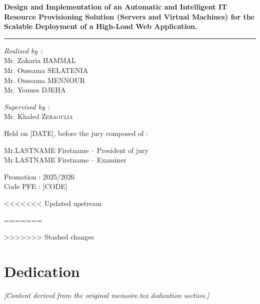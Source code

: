 \documentclass[12pt,a4paper]{report}
\begin{document}
\begin{titlepage}
{\Large \textbf{Design and Implementation of an Automatic and Intelligent IT Resource Provisioning Solution (Servers and Virtual Machines) for the Scalable Deployment of a High-Load Web Application.}}

\vspace{0.3cm}
\rule{\textwidth}{0.6pt}
\vspace{0.3cm}

\begin{minipage}{0.45\textwidth}
\normalsize \textit{Realized by :}\\
Mr. Zakaria \textsc{HAMMAL}\\
Mr. Oussama \textsc{SELATENIA}\\
Mr. Oussama \textsc{MENNOUR}\\
Mr. Younes \textsc{DJEHA}
\end{minipage}
\hfill
\begin{minipage}{0.45\textwidth}
\normalsize \textit{Supervised by :}\\
Mr. Khaled \textsc{Zeraoulia}
\end{minipage}

\vfill

{\normalsize Held on [DATE], before the jury composed of :}

{\normalsize Mr.\textsc{LASTNAME} Firstname \hspace{0.5cm} -- President of jury}\\
{\normalsize Mr.\textsc{LASTNAME} Firstname \hspace{0.5cm} -- Examiner}

\vspace{0.8cm}

{\normalsize Promotion : 2025/2026}\\
{\normalsize Code PFE : [CODE]}

\end{titlepage}
\restoregeometry

<<<<<<< Updated upstream

\newpage
=======

>>>>>>> Stashed changes
\chapter*{Dedication}
\begin{center}
\itshape
[Content derived from the original memoire.tex dedication section.]
\end{center}
\end{document}
